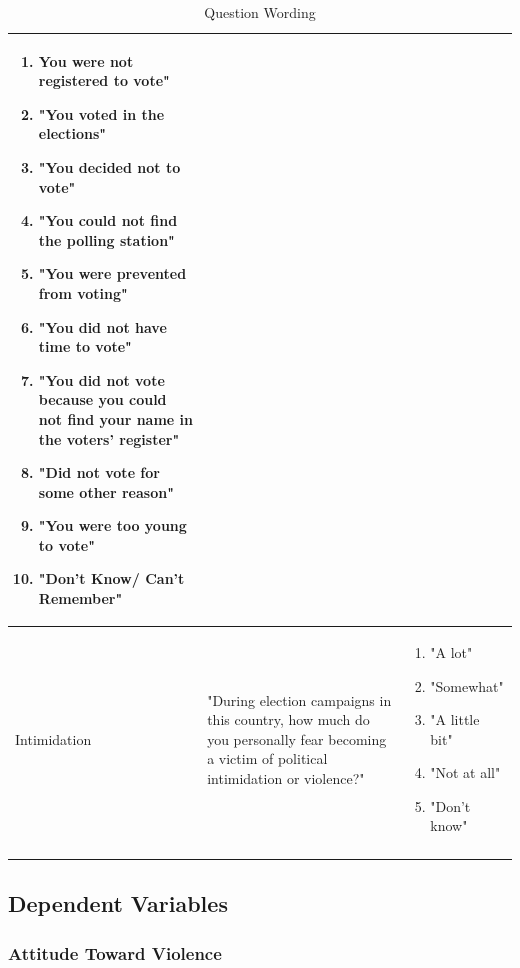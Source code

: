 \documentclass[12pt,]{book}
\theoremstyle{definition}
\theoremstyle{definition}
\theoremstyle{definition}
\theoremstyle{remark}
\begin{document}
\begin{longtable}{p{3cm} p{6cm} p{6cm}}
\begin{enumerate}
\item You were not registered to vote"
\item "You voted in the elections"
\item "You decided not to vote"
\item "You could not find the polling station"
\item"You were prevented from voting"
\item "You did not have time to vote"
\item "You did not vote because you could not find your name in the voters' register"
\item "Did not vote for some other reason"
\item "You were too young to vote"
\item "Don't Know/ Can't Remember"
\end{enumerate} \\
\hline
Intimidation & "During election campaigns in this country, how much do you personally fear becoming a victim of political intimidation or violence?" & \begin{enumerate}
\item "A lot" 
\item "Somewhat"
\item "A little bit" 
\item "Not at all" 
\item "Don’t know"
\end{enumerate} \\
\hline
\caption{Question Wording} \label{tab:wording}\\
\end{longtable}

\doublespacing

\hypertarget{dependent-variables}{%
\subsection{Dependent Variables}\label{dependent-variables}}

\hypertarget{attitude-toward-violence}{%
\subsubsection*{Attitude Toward
Violence}\label{attitude-toward-violence}}
\end{document}
